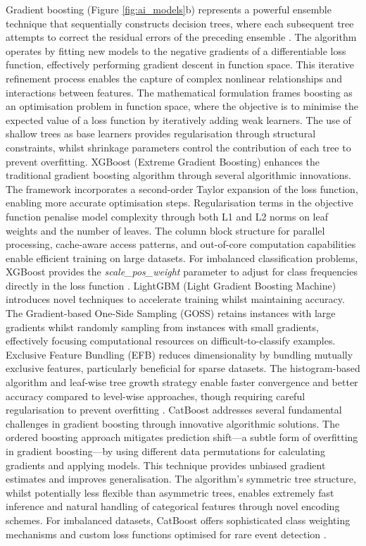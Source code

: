 Gradient  boosting (Figure \ref{fig:ai_models}b) represents a powerful ensemble technique that sequentially constructs decision trees, where each subsequent tree attempts to correct the residual errors of the preceding ensemble \citep{Bentéjac_2021}. The algorithm operates by fitting new models to the negative gradients of a differentiable loss function, effectively performing gradient descent in function space. This iterative refinement process enables the capture of complex nonlinear relationships and interactions between features. The mathematical formulation frames boosting as an optimisation problem in function space, where the objective is to minimise the expected value of a loss function by iteratively adding weak learners. The use of shallow trees as base learners provides regularisation through structural constraints, whilst shrinkage parameters control the contribution of each tree to prevent overfitting. XGBoost (Extreme Gradient Boosting) enhances the traditional gradient boosting algorithm through several algorithmic innovations. The framework incorporates a second-order Taylor expansion of the loss function, enabling more accurate optimisation steps. Regularisation terms in the objective function penalise model complexity through both L1 and L2 norms on leaf weights and the number of leaves. The column block structure for parallel processing, cache-aware access patterns, and out-of-core computation capabilities enable efficient training on large datasets. For imbalanced classification problems, XGBoost provides the \textit{scale\_pos\_weight} parameter to adjust for class frequencies directly in the loss function \citep{Chen_2016}. LightGBM (Light Gradient Boosting Machine) introduces novel techniques to accelerate training whilst maintaining accuracy. The Gradient-based One-Side Sampling (GOSS) retains instances with large gradients whilst randomly sampling from instances with small gradients, effectively focusing computational resources on difficult-to-classify examples. Exclusive Feature Bundling (EFB) reduces dimensionality by bundling mutually exclusive features, particularly beneficial for sparse datasets. The histogram-based algorithm and leaf-wise tree growth strategy enable faster convergence and better accuracy compared to level-wise approaches, though requiring careful regularisation to prevent overfitting \citep{Ke_2017}. CatBoost addresses several fundamental challenges in gradient boosting through innovative algorithmic solutions. The ordered boosting approach mitigates prediction shift—a subtle form of overfitting in gradient boosting—by using different data permutations for calculating gradients and applying models. This technique provides unbiased gradient estimates and improves generalisation. The algorithm's symmetric tree structure, whilst potentially less flexible than asymmetric trees, enables extremely fast inference and natural handling of categorical features through novel encoding schemes. For imbalanced datasets, CatBoost offers sophisticated class weighting mechanisms and custom loss functions optimised for rare event detection \citep{Prokhorenkova_2018}.

